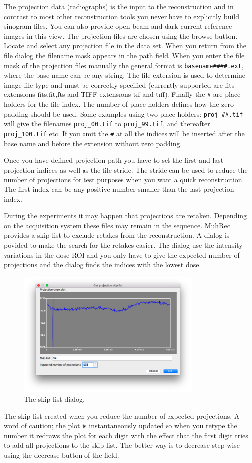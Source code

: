 \documentclass[a4paper]{scrreprt}
\begin{document}
The projection data (radiographs) is the input to the reconstruction and in contrast to most other reconstruction tools you never have to explicitly build sinogram files. You can also provide open beam and dark current reference images in this view. The projection files are chosen using the browse button. Locate and select any projection file in the data set. When you return from the file dialog the filename mask appears in the path field. When you enter the file mask of the projection files manually the general format is \verb+basename####.ext+, where the base name can be any string. The file extension is used to determine image file type and must be correctly specified (currently supported are fits extensions fits,fit,fts and TIFF extensions tif and tiff). Finally the \verb+#+ are place holders for the file index. The number of place holders defines how the zero padding should be used. Some examples using two place holders: \verb+proj_##.tif+ will give the filenames \verb+proj_00.tif+ to \verb+proj_99.tif+, and thereafter \verb+proj_100.tif+ etc. If you omit the \verb+#+ at all the indices will be inserted after the base name and before the extension without zero padding.

Once you have defined projection path you have to set the first and last projection indices as well as the file stride. The stride can be used to reduce the number of projections for test purposes when you want a quick reconstruction. The first index can be any positive number smaller than the last projection index.

During the experiments it may happen that projections are retaken. Depending on the acquisition system these files may remain in the sequence. MuhRec provides a skip list to exclude retakes from the reconstruction. A dialog is povided to make the search for the retakes easier. The dialog use the intensity variations in the dose ROI and you only have to give the expected number of projections and the dialog finds the indices with the lowest dose. 
\begin{figure}[ht!]
\centering
 \includegraphics[width=0.8\textwidth]{figures3/Dialog_SkipList.png}
\caption{The skip list dialog.}\label{fig_SkipList}
\end{figure}
The skip list created when you reduce the number of expected projections. A word of caution; the plot is instantaneously updated so when you retype the number it redraws the plot for each digit with the effect that the first digit tries to add all projections to the skip list. The better way is to decrease step wise using the decrease button of the field. 
\end{document}
